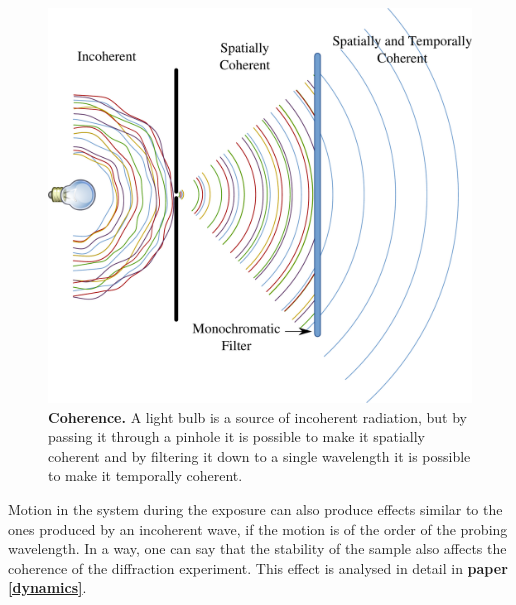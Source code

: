 \begin{figure}[h]
\begin{center}
\includegraphics[width=1.0 \columnwidth]{Diffraction_Theory/coherence.pdf}
\end{center}
\caption{{\bf Coherence.} A light bulb is a source of incoherent radiation, but by passing it
  through a pinhole it is possible to make it spatially coherent and by
  filtering it down to a single wavelength it is possible to make it temporally coherent. 
}
\label{Fig:coherence}
\end{figure}

Motion in the system during the exposure can also produce effects similar to
the ones produced by an incoherent wave, if the motion is of the order of the probing
wavelength. In a way, one can say that the stability of the sample also affects
the coherence of the diffraction experiment. This effect is analysed in detail
in {\bf paper \ref{dynamics}}.


